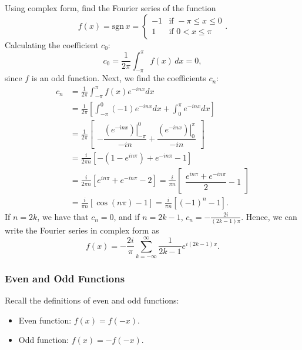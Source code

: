 \begin{eg}
	Using complex form, find the Fourier series of the function
	\[
	f(x) = \text{sgn}\,x = \begin{cases} -1 & \text{if } -\pi \leq x \leq 0 \\ 1 & \text{if } 0 < x \leq \pi \end{cases}.
	\]
	Calculating the coefficient $c_0$:
	\[
	c_0 = \frac{1}{2\pi} \int_{-\pi}^{\pi} f(x) \,dx = 0,
	\]
	since $f$ is an odd function. Next, we find the coefficients $c_n$:
	\begin{align*}
		c_n &= \frac{1}{2\pi} \int_{-\pi}^{\pi} f(x){e^{-inx}}dx \\
		&= \frac{1}{2\pi}\left[ \int_{-\pi}^0 \left( {-1} \right){e^{-inx}}dx + \int_0^{\pi} e^{-inx}dx \right] \\
		&= \frac{1}{2\pi} \begin{bmatrix} -\dfrac{\left. \left( e^{-inx} \right) \right|_{-\pi }^0}{-in} + \dfrac{\left. \left( e^{-inx} \right) \right|_0^\pi }{-in} \end{bmatrix} \\
		&= \frac{i}{2\pi n}\left[-\left(1-e^{in\pi} \right) + e^{-in\pi}-1 \right] \\
		&= \frac{i}{2\pi n}\left[e^{in\pi} + e^{-in\pi}-2 \right] = \frac{i}{\pi n} \begin{bmatrix} \dfrac{e^{in\pi} + e^{-in\pi}}{2}-1 \end{bmatrix} \\
		&= \frac{i}{\pi n}\left[\cos(n\pi)-1\right] = \frac{i}{\pi n}\left[(-1)^n-1\right].
	\end{align*}
	If $n=2k$, we have that $c_n = 0$, and if $n=2k-1$, $c_n = -\frac{2i}{(2k-1)\pi}$. Hence, we can write the Fourier series in complex form as
	\[
	f(x) = -\frac{2i}{\pi} \sum_{k=-\infty}^{\infty} \frac{1}{2k-1}e^{i(2k-1)x}.
	\]
\end{eg}

\subsubsection{Even and Odd Functions}\label{sec:evenoddfourier}

Recall the definitions of even and odd functions:
\begin{itemize}
	\item Even function: $f(x) = f(-x)$.
	\item Odd function: $f(x) = -f(-x)$.
\end{itemize}

